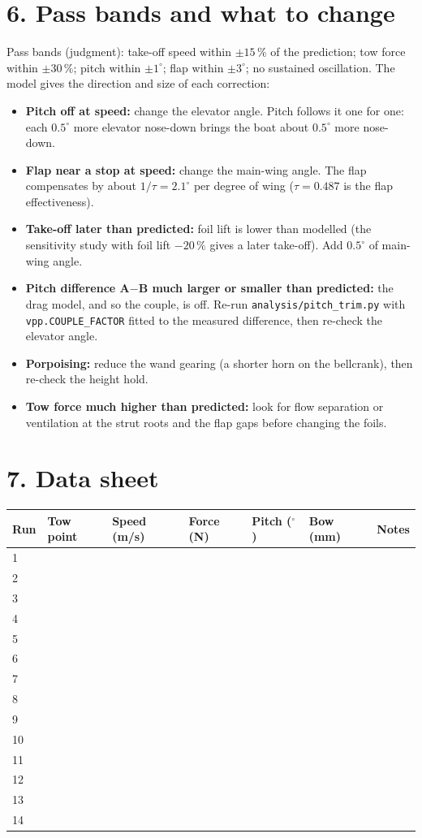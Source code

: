 \documentclass[11pt]{article}
\begin{document}
\section*{6. Pass bands and what to change}
Pass bands (judgment): take-off speed within $\pm15\,\%$ of the prediction; tow force within $\pm30\,\%$; pitch within $\pm1^\circ$; flap within $\pm3^\circ$; no sustained oscillation. The model gives the direction and size of each correction:
\begin{itemize}
\item \textbf{Pitch off at speed:} change the elevator angle. Pitch follows it one for one: each $0.5^\circ$ more elevator nose-down brings the boat about $0.5^\circ$ more nose-down.
\item \textbf{Flap near a stop at speed:} change the main-wing angle. The flap compensates by about $1/\tau=2.1^\circ$ per degree of wing ($\tau=0.487$ is the flap effectiveness).
\item \textbf{Take-off later than predicted:} foil lift is lower than modelled (the sensitivity study with foil lift $-20\,\%$ gives a later take-off). Add $0.5^\circ$ of main-wing angle.
\item \textbf{Pitch difference A$-$B much larger or smaller than predicted:} the drag model, and so the couple, is off. Re-run \texttt{analysis/pitch\_trim.py} with \texttt{vpp.COUPLE\_FACTOR} fitted to the measured difference, then re-check the elevator angle.
\item \textbf{Porpoising:} reduce the wand gearing (a shorter horn on the bellcrank), then re-check the height hold.
\item \textbf{Tow force much higher than predicted:} look for flow separation or ventilation at the strut roots and the flap gaps before changing the foils.
\end{itemize}

\section*{7. Data sheet}
\begin{tabular}{lllllll}
\toprule
Run & Tow point & Speed (m/s) & Force (N) & Pitch ($^\circ$) & Bow (mm) & Notes \\
\midrule
1 & & & & & & \\[6pt]
2 & & & & & & \\[6pt]
3 & & & & & & \\[6pt]
4 & & & & & & \\[6pt]
5 & & & & & & \\[6pt]
6 & & & & & & \\[6pt]
7 & & & & & & \\[6pt]
8 & & & & & & \\[6pt]
9 & & & & & & \\[6pt]
10 & & & & & & \\[6pt]
11 & & & & & & \\[6pt]
12 & & & & & & \\[6pt]
13 & & & & & & \\[6pt]
14 & & & & & & \\[6pt]
\bottomrule
\end{tabular}
\end{document}
